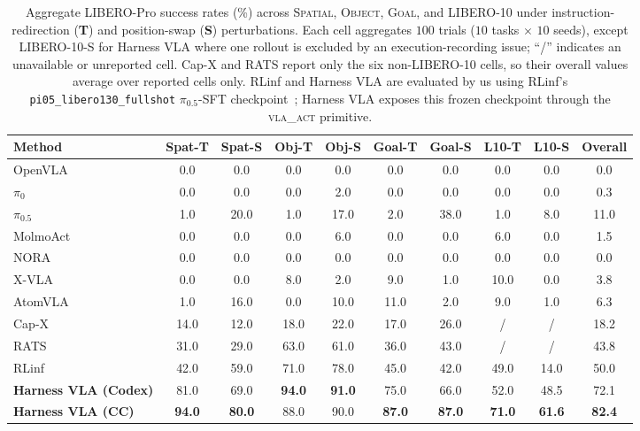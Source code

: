 \documentclass{article}
\begin{document}
\begin{table}[htbp]
\centering
\caption{Aggregate LIBERO-Pro success rates (\%) across \textsc{Spatial}, \textsc{Object}, \textsc{Goal}, and \textsc{LIBERO-10} under instruction-redirection (\textbf{T}) and position-swap (\textbf{S}) perturbations. Each cell aggregates $100$ trials ($10$ tasks $\times$ $10$ seeds), except \textsc{LIBERO-10-S} for Harness VLA where one rollout is excluded by an execution-recording issue; ``/'' indicates an unavailable or unreported cell. Cap-X and RATS report only the six non-\textsc{LIBERO-10} cells, so their overall values average over reported cells only. RLinf and Harness VLA are evaluated by us using RLinf's \texttt{pi05\_libero130\_fullshot} $\pi_{0.5}$-SFT checkpoint~\citep{yu2025rlinf}; Harness VLA exposes this frozen checkpoint through the \textsc{vla\_act} primitive.}
\label{tab:libero_pro_perturbation}
\small
\setlength{\tabcolsep}{4pt}
\begin{tabular}{l cccccccc c}
\toprule
Method & Spat-T & Spat-S & Obj-T & Obj-S & Goal-T & Goal-S & L10-T & L10-S & \textbf{Overall} \\
\midrule
OpenVLA~\citep{kim2024openvla}           & 0.0 & 0.0 & 0.0 & 0.0 & 0.0 & 0.0 & 0.0 & 0.0 & 0.0 \\
$\pi_0$~\citep{black2025pi0}             & 0.0 & 0.0 & 0.0 & 2.0 & 0.0 & 0.0 & 0.0 & 0.0 & 0.3 \\
$\pi_{0.5}$~\citep{black2025pi05}        & 1.0 & 20.0 & 1.0 & 17.0 & 2.0 & 38.0 & 1.0 & 8.0 & 11.0 \\
MolmoAct~\citep{molmoact2025}            & 0.0 & 0.0 & 0.0 & 6.0 & 0.0 & 0.0 & 6.0 & 0.0 & 1.5 \\
NORA~\citep{hung2025nora}                & 0.0 & 0.0 & 0.0 & 0.0 & 0.0 & 0.0 & 0.0 & 0.0 & 0.0 \\
X-VLA~\citep{zheng2025xvla}              & 0.0 & 0.0 & 8.0 & 2.0 & 9.0 & 1.0 & 10.0 & 0.0 & 3.8 \\
AtomVLA~\citep{sun2026atomvla}           & 1.0 & 16.0 & 0.0 & 10.0 & 11.0 & 2.0 & 9.0 & 1.0 & 6.3 \\
\midrule
Cap-X~\citep{fu2026cap}                  & 14.0 & 12.0 & 18.0 & 22.0 & 17.0 & 26.0 &  / &  / & 18.2 \\
RATS~\citep{zhang2026playful}            & 31.0 & 29.0 & 63.0 & 61.0 & 36.0 & 43.0 &  / &  / & 43.8 \\
\midrule
RLinf                                    & 42.0 & 59.0 & 71.0 & 78.0 & 45.0 & 42.0 & 49.0 & 14.0 & 50.0 \\
\textbf{Harness VLA (Codex)}             & 81.0 & 69.0 & \textbf{94.0} & \textbf{91.0} & 75.0 & 66.0 & 52.0 & 48.5 & 72.1 \\
\textbf{Harness VLA (CC)}                & \textbf{94.0} & \textbf{80.0} & 88.0 & 90.0 & \textbf{87.0} & \textbf{87.0} & \textbf{71.0} & \textbf{61.6} & \textbf{82.4} \\
\bottomrule
\end{tabular}
\end{table}
\end{document}
